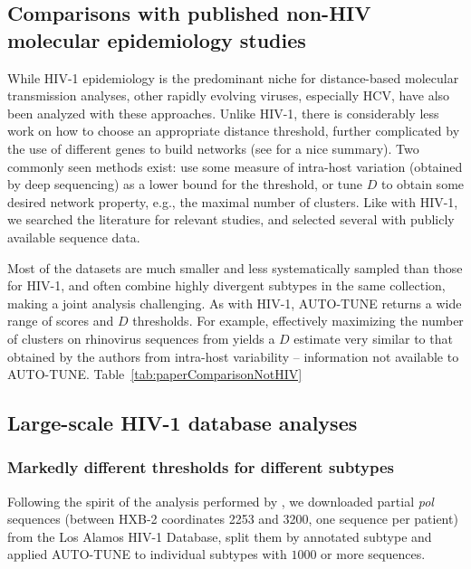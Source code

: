 \documentclass[utf8]{FrontiersinHarvard} %
\begin{document}
\subsection{Comparisons with published non-HIV molecular epidemiology studies}

While HIV-1 epidemiology is the predominant niche for distance-based molecular
transmission analyses, other rapidly evolving viruses, especially HCV, have
also been analyzed with these approaches. Unlike HIV-1, there is considerably
less work on how to choose an appropriate distance threshold, further
complicated by the use of different genes to build networks (see
\citet{Chan:2020aa} for a nice summary). Two commonly seen methods exist: use
some measure of intra-host variation (obtained by deep sequencing) as a lower
bound for the threshold, or tune $D$ to obtain some desired network property,
e.g., the maximal number of clusters. Like with HIV-1, we searched the
literature for relevant studies, and selected several with publicly available
sequence data.

Most of the datasets are much smaller and less systematically sampled than
those for HIV-1, and often combine highly divergent subtypes in the same
collection, making a joint analysis challenging. As with HIV-1, AUTO-TUNE
returns a wide range of scores and $D$ thresholds. For example, effectively
maximizing the number of clusters on rhinovirus sequences from
\citet{Ng:2022aa} yields a $D$ estimate very similar to that obtained by the
authors from intra-host variability -- information not available to AUTO-TUNE.
Table~\ref{tab:paperComparisonNotHIV}

\subsection{Large-scale HIV-1 database analyses}

\subsubsection{Markedly different thresholds for different subtypes}
Following the spirit of the analysis performed by \citet{Wertheim:2014aa}, we
downloaded partial {\it pol} sequences (between HXB-2 coordinates 2253 and
3200, one sequence per patient) from the Los Alamos HIV-1 Database, split them
by annotated subtype and applied AUTO-TUNE to individual subtypes with $1000$
or more sequences.
\end{document}
